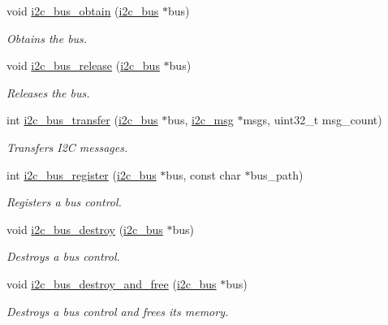 \begin{DoxyCompactItemize}
\item 
void \mbox{\hyperlink{group__I2CBus_ga18a5b66cdf62e17b8610b99cf8fef086}{i2c\+\_\+bus\+\_\+obtain}} (\mbox{\hyperlink{structi2c__bus}{i2c\+\_\+bus}} $\ast$bus)
\begin{DoxyCompactList}\small\item\em Obtains the bus. \end{DoxyCompactList}\item 
void \mbox{\hyperlink{group__I2CBus_gabf677e37011d97c32fc2253004fe1a72}{i2c\+\_\+bus\+\_\+release}} (\mbox{\hyperlink{structi2c__bus}{i2c\+\_\+bus}} $\ast$bus)
\begin{DoxyCompactList}\small\item\em Releases the bus. \end{DoxyCompactList}\item 
int \mbox{\hyperlink{group__I2CBus_ga0b55fa0b52b40128fdc2d5fbcfe317dc}{i2c\+\_\+bus\+\_\+transfer}} (\mbox{\hyperlink{structi2c__bus}{i2c\+\_\+bus}} $\ast$bus, \mbox{\hyperlink{structi2c__msg}{i2c\+\_\+msg}} $\ast$msgs, uint32\+\_\+t msg\+\_\+count)
\begin{DoxyCompactList}\small\item\em Transfers I2C messages. \end{DoxyCompactList}\item 
int \mbox{\hyperlink{group__I2CBus_ga6987c0edf1d40adf54d2689fed47c3cf}{i2c\+\_\+bus\+\_\+register}} (\mbox{\hyperlink{structi2c__bus}{i2c\+\_\+bus}} $\ast$bus, const char $\ast$bus\+\_\+path)
\begin{DoxyCompactList}\small\item\em Registers a bus control. \end{DoxyCompactList}\item 
void \mbox{\hyperlink{group__I2CBus_ga000d6042dcb980798aa8358dbdd5cfba}{i2c\+\_\+bus\+\_\+destroy}} (\mbox{\hyperlink{structi2c__bus}{i2c\+\_\+bus}} $\ast$bus)
\begin{DoxyCompactList}\small\item\em Destroys a bus control. \end{DoxyCompactList}\item 
void \mbox{\hyperlink{group__I2CBus_ga174d189593676d0053ca88bc6edb238d}{i2c\+\_\+bus\+\_\+destroy\+\_\+and\+\_\+free}} (\mbox{\hyperlink{structi2c__bus}{i2c\+\_\+bus}} $\ast$bus)
\begin{DoxyCompactList}\small\item\em Destroys a bus control and frees its memory. \end{DoxyCompactList}\item 

\end{DoxyCompactItemize}
